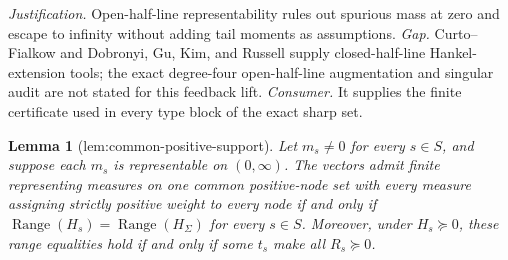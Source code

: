 \documentclass{article}
\newtheorem{lemma}{Lemma}
\begin{document}
\par\smallskip\noindent \textit{Justification.} Open-half-line representability rules out spurious mass at zero and escape to infinity without adding tail moments as assumptions. \textit{Gap.} Curto--Fialkow and Dobronyi, Gu, Kim, and Russell supply closed-half-line Hankel-extension tools; the exact degree-four open-half-line augmentation and singular audit are not stated for this feedback lift. \textit{Consumer.} It supplies the finite certificate used in every type block of the exact sharp set.

\begin{lemma}[lem:common-positive-support]\label{lem:common-positive-support}
Let \(m_s\ne0\) for every \(s\in S\), and suppose each \(m_s\) is representable on \((0,\infty)\). The vectors admit finite representing measures on one common positive-node set with every measure assigning strictly positive weight to every node if and only if \(\operatorname{Range}(H_s)=\operatorname{Range}(H_{\Sigma})\) for every \(s\in S\). Moreover, under \(H_s\succeq0\), these range equalities hold if and only if some \(t_s\) make all \(R_s\succeq0\).
\end{lemma}
\end{document}

